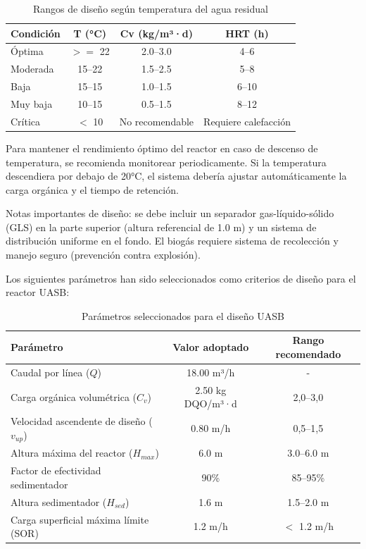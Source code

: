 \documentclass[12pt,a4paper]{article}
\begin{document}
\begin{table}[H]
\centering
\caption{Rangos de diseño según temperatura del agua residual}
\small
\begin{tabular}{lccc}
\toprule
\textbf{Condición} & \textbf{T (°C)} & \textbf{Cv (kg/m³·d)} & \textbf{HRT (h)} \\
\midrule
Óptima & $>=$ 22 & 2.0--3.0 & 4--6 \\
Moderada & 15--22 & 1.5--2.5 & 5--8 \\
Baja & 15--15 & 1.0--1.5 & 6--10 \\
Muy baja & 10--15 & 0.5--1.5 & 8--12 \\
Crítica & $<$ 10 & No recomendable & Requiere calefacción \\
\bottomrule
\end{tabular}
\end{table}

Para mantener el rendimiento óptimo del reactor en caso de descenso de temperatura, se recomienda monitorear periodicamente. Si la temperatura descendiera por debajo de 20°C, el sistema debería ajustar automáticamente la carga orgánica y el tiempo de retención.

Notas importantes de diseño: se debe incluir un separador gas-líquido-sólido (GLS) en la parte superior (altura referencial de 1.0 m) y un sistema de distribución uniforme en el fondo. El biogás requiere sistema de recolección y manejo seguro (prevención contra explosión).

Los siguientes parámetros han sido seleccionados como criterios de diseño para el reactor UASB:

\begin{table}[H]
\centering
\caption{Parámetros seleccionados para el diseño UASB}
\begin{tabular}{p{6cm}cc}
\toprule
\textbf{Parámetro} & \textbf{Valor adoptado} & \textbf{Rango recomendado} \\
\midrule
Caudal por línea ($Q$) & 18.00 m³/h & - \\
Carga orgánica volumétrica ($C_v$) & 2.50 kg DQO/m³·d & 2,0--3,0 \\
Velocidad ascendente de diseño ($v_{up}$) & 0.80 m/h & 0,5--1,5 \\
Altura máxima del reactor ($H_{max}$) & 6.0 m & 3.0--6.0 m \\
Factor de efectividad sedimentador & 90\% & 85--95\% \\
Altura sedimentador ($H_{sed}$) & 1.6 m & 1.5--2.0 m \\
Carga superficial máxima límite (SOR) & 1.2 m/h & $<$ 1.2 m/h \\
\bottomrule
\end{tabular}
\end{table}
\end{document}
